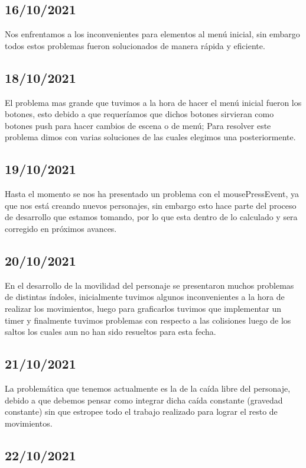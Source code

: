 \documentclass{article}
\begin{document}
    \subsection{16/10/2021}
    Nos enfrentamos a los inconvenientes para elementos al menú inicial, sin embargo todos estos problemas fueron solucionados de manera rápida y eficiente.   
     
    \subsection{18/10/2021}
    El problema mas grande que tuvimos a la hora de hacer el menú inicial fueron los botones, esto debido a que requeríamos que dichos botones sirvieran como botones push para hacer cambios de escena o de menú; Para resolver este problema dimos con varias soluciones de las cuales elegimos una posteriormente.
    
    \subsection{19/10/2021}    
    Hasta el momento se nos ha presentado un problema con el mousePressEvent, ya que nos está creando nuevos personajes, sin embargo esto hace parte del proceso de desarrollo que estamos tomando, por lo que esta dentro de lo calculado y sera corregido en próximos avances.
    
    \subsection{20/10/2021}
    En el desarrollo de la movilidad del personaje se presentaron muchos problemas de distintas índoles, inicialmente tuvimos algunos inconvenientes a la hora de realizar los movimientos, luego para graficarlos tuvimos que implementar un timer y finalmente tuvimos problemas con respecto a las colisiones luego de los saltos los cuales aun no han sido resueltos para esta fecha.
    
    \subsection{21/10/2021}
    La problemática que tenemos actualmente es la de la caída libre del personaje, debido a que debemos pensar como integrar dicha caída constante (gravedad constante) sin que estropee todo el trabajo realizado para lograr el resto de movimientos.
    
    \subsection{22/10/2021}
    
\vfill
\vspace*{0.5cm}


    
\end{document}

